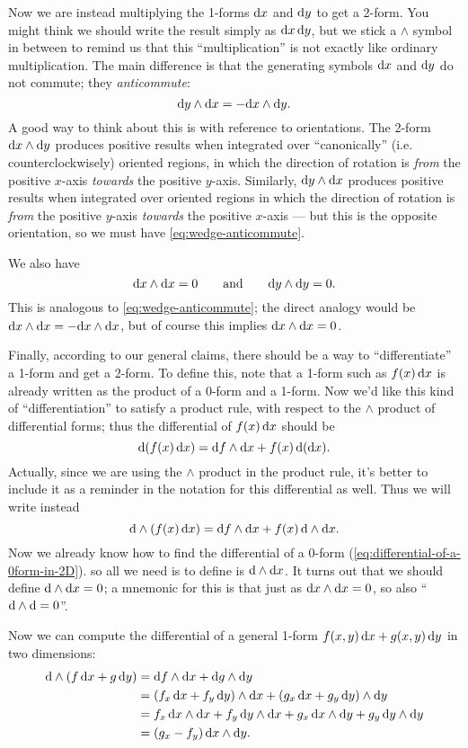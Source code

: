\documentclass[12pt]{amsart}
\begin{document}
Now we are instead multiplying the 1-forms ${\mathrm{d} x}$ and ${\mathrm{d} y}$ to get a 2-form.
You might think we should write the result simply as ${\mathrm{d} x}\,{\mathrm{d} y}$, but we stick a $\wedge$ symbol in between to remind us that this ``multiplication'' is not exactly like ordinary multiplication.
The main difference is that the generating symbols ${\mathrm{d} x}$ and ${\mathrm{d} y}$ do not commute; they \emph{anticommute}:
\begin{equation}
  {\ensuremath{\mathrm{d} y}}\wedge{\ensuremath{\mathrm{d} x}} = - {\mathrm{d} x}\wedge {\ensuremath{\mathrm{d} y}}.\label{eq:wedge-anticommute}
\end{equation}
A good way to think about this is with reference to orientations.
The 2-form ${\mathrm{d} x}\wedge{\ensuremath{\mathrm{d} y}}$ produces positive results when integrated over ``canonically'' (i.e. counterclockwisely) oriented regions, in which the direction of rotation is \emph{from} the positive $x$-axis \emph{towards} the positive $y$-axis.
Similarly, ${\mathrm{d} y}\wedge{\ensuremath{\mathrm{d} x}}$ produces positive results when integrated over oriented regions in which the direction of rotation is \emph{from} the positive $y$-axis \emph{towards} the positive $x$-axis --- but this is the opposite orientation, so we must have \cref{eq:wedge-anticommute}.

We also have
\[ {\mathrm{d} x} \wedge {\ensuremath{\mathrm{d} x}} = 0 \qquad\text{and}\qquad {\ensuremath{\mathrm{d} y}}\wedge {\ensuremath{\mathrm{d} y}} = 0. \]
This is analogous to \cref{eq:wedge-anticommute}; the direct analogy would be ${\mathrm{d} x}\wedge{\ensuremath{\mathrm{d} x}} = - {\mathrm{d} x}\wedge{\ensuremath{\mathrm{d} x}}$, but of course this implies ${\mathrm{d} x}\wedge{\ensuremath{\mathrm{d} x}}=0$.

Finally, according to our general claims, there should be a way to ``differentiate'' a 1-form and get a 2-form.
To define this, note that a 1-form such as $f(x)\,{\mathrm{d} x}$ is already written as the product of a 0-form and a 1-form.
Now we'd like this kind of ``differentiation'' to satisfy a product rule, with respect to the $\wedge$ product of differential forms; thus the differential of $f(x)\,{\mathrm{d} x}$ should be
\[ \mathrm{d}(f(x)\,{\mathrm{d} x}) =  {\mathrm{d} f} \wedge{\ensuremath{\mathrm{d} x}} + f(x)\, \mathrm{d}({\mathrm{d} x}). \]
Actually, since we are using the $\wedge$ product in the product rule, it's better to include it as a reminder in the notation for this differential as well.
Thus we will write instead
\[ \mathrm{d}\wedge(f(x)\,{\mathrm{d} x}) =  {\mathrm{d} f} \wedge{\ensuremath{\mathrm{d} x}} + f(x)\, \mathrm{d}\wedge{\ensuremath{\mathrm{d} x}}. \]
Now we already know how to find the differential of a 0-form (\cref{eq:differential-of-a-0form-in-2D}). so all we need is to define is $\mathrm{d}\wedge{\ensuremath{\mathrm{d} x}}$.
It turns out that we should define $\mathrm{d}\wedge{\ensuremath{\mathrm{d} x}}=0$; a mnemonic for this is that just as ${\mathrm{d} x}\wedge {\ensuremath{\mathrm{d} x}} = 0$, so also ``$\mathrm{d}\wedge\mathrm{d} = 0$''.

Now we can compute the differential of a general 1-form $f(x,y)\,{\mathrm{d} x} + g(x,y)\,{\mathrm{d} y}$ in two dimensions:
\begin{align*}
  \mathrm{d}\wedge(f\,{\mathrm{d} x} + g\,{\mathrm{d} y})
  &= {\mathrm{d} f} \wedge {\ensuremath{\mathrm{d} x}} + {\mathrm{d} g} \wedge{\ensuremath{\mathrm{d} y}}\\
  &= ({f}_{x}\, {\mathrm{d} x} + {f}_{y}\, {\mathrm{d} y}) \wedge {\ensuremath{\mathrm{d} x}} + ({g}_{x} \,{\mathrm{d} x}+{g}_{y}\,{\mathrm{d} y})\wedge{\ensuremath{\mathrm{d} y}} \\
  &= {f}_{x}\, {\mathrm{d} x}\wedge{\ensuremath{\mathrm{d} x}} + {f}_{y}\, {\mathrm{d} y}\wedge {\ensuremath{\mathrm{d} x}} + {g}_{x} \,{\mathrm{d} x} \wedge{\ensuremath{\mathrm{d} y}} + {g}_{y}\,{\mathrm{d} y}\wedge{\ensuremath{\mathrm{d} y}} \\
  &= ({g}_{x} - {f}_{y})\, {\mathrm{d} x}\wedge{\ensuremath{\mathrm{d} y}}.
\end{align*}
\end{document}
